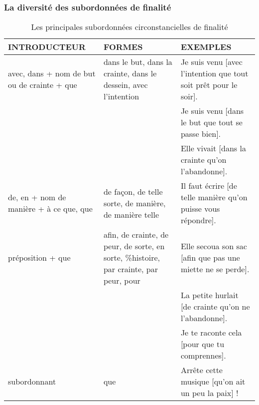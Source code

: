 \documentclass[UTF8]{report}
\begin{document}
\subsubsection{La diversité des subordonnées de finalité}


\begin{table}[H]
    \centering
    \begin{adjustbox}{max width =\textwidth}
        \begin{tabular}{|p{3cm}|p{6cm}|p{6cm}|}
        \hline
        \rowcolor{cyan!20}
        \textbf{INTRODUCTEUR} & \textbf{FORMES} & \textbf{EXEMPLES} \\
        \hline
        avec, dans + nom de but ou de crainte + que & dans le but, dans la crainte, dans le dessein, avec l'intention & Je suis venu [avec l'intention que tout soit prêt pour le soir]. \\
        & & Je suis venu [dans le but que tout se passe bien]. \\
        & & Elle vivait [dans la crainte qu'on l'abandonne]. \\
        \hline
        de, en + nom de manière + à ce que, que & de façon, de telle sorte, de manière, de manière telle & Il faut écrire [de telle manière qu'on puisse vous répondre]. \\
        \hline
        préposition + que & afin, de crainte, de peur, de sorte, en sorte, \%histoire, par crainte, par peur, pour & Elle secoua son sac [afin que pas une miette ne se perde]. \\
        & & La petite hurlait [de crainte qu'on ne l'abandonne]. \\
        & & Je te raconte cela [pour que tu comprennes]. \\
        \hline
        subordonnant & que & Arrête cette musique [qu'on ait un peu la paix] ! \\
        \hline
        \end{tabular}
    \end{adjustbox}
    \caption{Les principales subordonnées circonstancielles de finalité}
\end{table}
\end{document}
